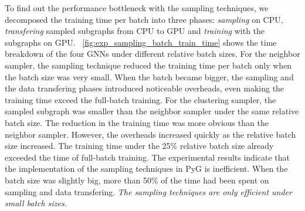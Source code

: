 To find out the performance bottleneck with the sampling techniques, we decomposed the training time per batch into three phases: \emph{sampling} on CPU, \emph{transfering} sampled subgraphs from CPU to GPU and \emph{training} with the subgraphs on GPU.
\figurename~\ref{fig:exp_sampling_batch_train_time} shows the time breakdown of the four GNNs under different relative batch sizes.
For the neighbor sampler, the sampling technique reduced the training time per batch only when the batch size was very small.
When the batch became bigger, the sampling and the data transfering phases introduced noticeable overheads, even making the training time exceed the full-batch training.
For the clustering sampler, the sampled subgraph was smaller than the neighbor sampler under the same relative batch size.
The reduction in the training time was more obvious than the neighbor sampler.
However, the overheads increased quickly as the relative batch size increased.
The training time under the 25\% relative batch size already exceeded the time of full-batch training.
The experimental results indicate that the implementation of the sampling techniques in PyG is inefficient.
When the batch size was slightly big, more than 50\% of the time had been spent on sampling and data transfering.
\emph{The sampling techniques are only efficient under small batch sizes.}

